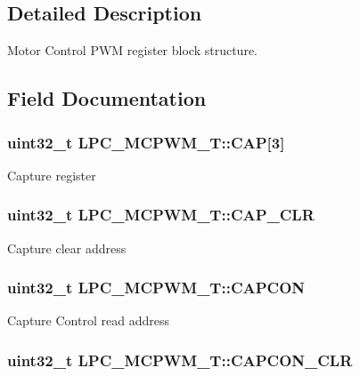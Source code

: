 \subsection{Detailed Description}
Motor Control P\-W\-M register block structure. 

\subsection{Field Documentation}
\hypertarget{structLPC__MCPWM__T_a015a4607abaca03f64acaeae4a0ccaf7}{
\subsubsection[{C\-A\-P}]{ uint32\-\_\-t L\-P\-C\-\_\-\-M\-C\-P\-W\-M\-\_\-\-T\-::\-C\-A\-P\mbox{[}3\mbox{]}}}\label{structLPC__MCPWM__T_a015a4607abaca03f64acaeae4a0ccaf7}
Capture register \hypertarget{structLPC__MCPWM__T_a88da2eb831f09cf7145f57c45b224e91}{
\subsubsection[{C\-A\-P\-\_\-\-C\-L\-R}]{ uint32\-\_\-t L\-P\-C\-\_\-\-M\-C\-P\-W\-M\-\_\-\-T\-::\-C\-A\-P\-\_\-\-C\-L\-R}}\label{structLPC__MCPWM__T_a88da2eb831f09cf7145f57c45b224e91}
Capture clear address \hypertarget{structLPC__MCPWM__T_a47afe6c393cc7da61af1d48bfc0f709c}{
\subsubsection[{C\-A\-P\-C\-O\-N}]{ uint32\-\_\-t L\-P\-C\-\_\-\-M\-C\-P\-W\-M\-\_\-\-T\-::\-C\-A\-P\-C\-O\-N}}\label{structLPC__MCPWM__T_a47afe6c393cc7da61af1d48bfc0f709c}
Capture Control read address \hypertarget{structLPC__MCPWM__T_aadd69d706d636d53ff8893d3a0be210a}{
\subsubsection[{C\-A\-P\-C\-O\-N\-\_\-\-C\-L\-R}]{ uint32\-\_\-t L\-P\-C\-\_\-\-M\-C\-P\-W\-M\-\_\-\-T\-::\-C\-A\-P\-C\-O\-N\-\_\-\-C\-L\-R}}\label{structLPC__MCPWM__T_aadd69d706d636d53ff8893d3a0be210a}
